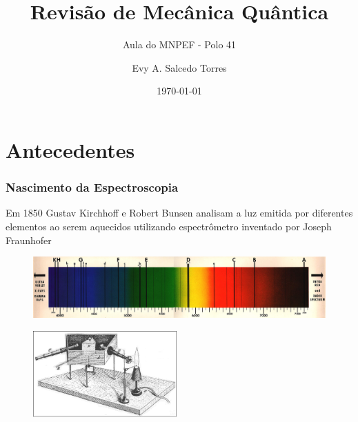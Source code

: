 \documentclass[12pt,brazil]{beamer}
\title{Revisão de Mecânica Quântica}
\subtitle{Aula do MNPEF - Polo 41}
\author{Evy A. Salcedo Torres}
\date{\today}
\begin{document}

\begin{frame}
  \titlepage
\end{frame}


\section{Antecedentes}


\begin{frame}
  \frametitle{Nascimento da Espectroscopia}

  \begin{multicols}{2}
    \begin{minipage}[b][20ex][t]{\linewidth}
    \vspace*{0.5cm}
      Em 1850 Gustav Kirchhoff e Robert Bunsen analisam a luz emitida por diferentes elementos ao serem aquecidos utilizando espectrômetro inventado por Joseph Fraunhofer
    \end{minipage}

    \begin{minipage}[b][20ex][t]{\linewidth}
      \begin{figure}
        \includegraphics[width=12cm]{figuras/fig02}
      \end{figure}
    \end{minipage}

    \begin{minipage}[b][40ex][t]{\linewidth}
    \vspace*{0.5cm}
      \begin{figure}
        \includegraphics[width=5.5cm]{figuras/fig01}
      \end{figure}
    \end{minipage}
  \end{multicols}
\end{frame}
\end{document}
